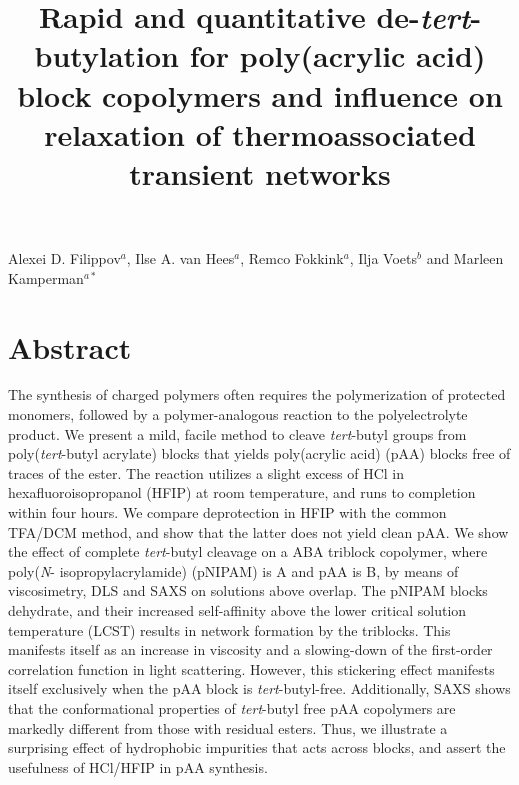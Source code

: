 \documentclass{article}
\date{}
\begin{document}
\title{Rapid and quantitative de-\emph{tert}-butylation for poly(acrylic acid) block copolymers and
influence on relaxation of thermoassociated transient networks}%
\maketitle
\noindent\large{Alexei D. Filippov\textit{$^a$}, Ilse A. van Hees$^a$, Remco Fokkink$^a$, Ilja Voets\textit{$^b$} and Marleen Kamperman\textit{$^{a\ast}$}} \\%


\section*{Abstract}
The synthesis of charged polymers often requires the polymerization of protected monomers, followed by 
a polymer-analogous reaction to the polyelectrolyte product. We present a mild, facile method 
to cleave \emph{tert}-butyl groups from poly(\emph{tert}-butyl acrylate) blocks that yields
poly(acrylic acid) (pAA) blocks free of traces of the ester. The reaction utilizes a slight excess of HCl
in hexafluoroisopropanol (HFIP) at room temperature, and runs to completion within four hours. We compare deprotection
in HFIP with the common TFA/DCM method, and show that the latter does not yield clean pAA. We show the effect
of complete \emph{tert}-butyl cleavage on a ABA triblock copolymer, where poly(\emph{N}-
isopropylacrylamide) (pNIPAM) is A and pAA is B, by means of viscosimetry, DLS and SAXS 
on solutions above overlap. The pNIPAM blocks dehydrate, and their increased self-affinity above the 
lower critical solution temperature (LCST) results in network formation by the triblocks.
This manifests itself as an increase in viscosity and a slowing-down of the first-order correlation
function in light scattering. However, this stickering effect manifests itself exclusively when 
the pAA block is \emph{tert}-butyl-free. Additionally, SAXS shows that the conformational 
properties of \emph{tert}-butyl free pAA copolymers are markedly different from those with 
residual esters. Thus, we illustrate a surprising effect of hydrophobic impurities that acts
across blocks, and assert the usefulness of HCl/HFIP in pAA synthesis.\\
\end{document}
